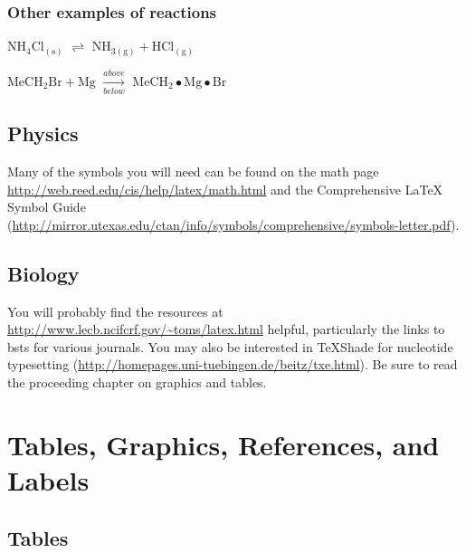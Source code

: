 \documentclass[grad,numbers]{coppe}
\begin{document}
  \hypertarget{other-examples-of-reactions}{%
  \subsection{Other examples of reactions}\label{other-examples-of-reactions}}
  
  \(\mathrm{NH_4Cl_{(s)}}\) \(\rightleftharpoons\) \(\mathrm{NH_{3(g)}+HCl_{(g)}}\)
  
  \noindent \(\mathrm{MeCH_2Br + Mg}\) \(\xrightarrow[below]{above}\) \(\mathrm{MeCH_2\bullet Mg \bullet Br}\)
  
  \hypertarget{physics}{%
  \section{Physics}\label{physics}}
  
  Many of the symbols you will need can be found on the math page \url{http://web.reed.edu/cis/help/latex/math.html} and the Comprehensive LaTeX Symbol Guide (\url{http://mirror.utexas.edu/ctan/info/symbols/comprehensive/symbols-letter.pdf}).
  
  \hypertarget{biology}{%
  \section{Biology}\label{biology}}
  
  You will probably find the resources at \url{http://www.lecb.ncifcrf.gov/~toms/latex.html} helpful, particularly the links to bsts for various journals. You may also be interested in TeXShade for nucleotide typesetting (\url{http://homepages.uni-tuebingen.de/beitz/txe.html}). Be sure to read the proceeding chapter on graphics and tables.
  
  \hypertarget{ref-labels}{%
  \chapter{Tables, Graphics, References, and Labels}\label{ref-labels}}
  
  \hypertarget{tables}{%
  \section{Tables}\label{tables}}
  
\end{document}
